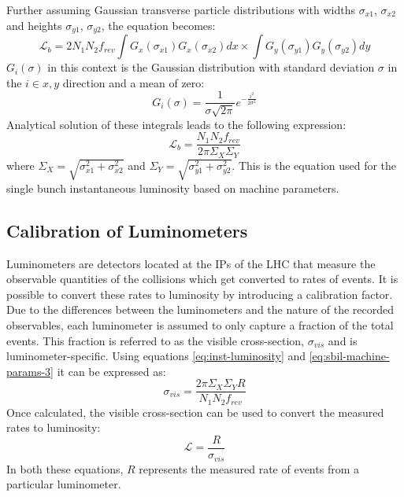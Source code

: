 Further assuming Gaussian transverse particle distributions with widths $\sigma_{x1}$, $\sigma_{x2}$ and heights $\sigma_{y1}$, $\sigma_{y2}$, the equation becomes:
\begin{equation}
    \label{eq:sbil-machine-params-3}
    \mathcal{L}_b = 2 N_1 N_2 f_{rev} \int G_x (\sigma_{x1}) G_x (\sigma_{x2}) dx \times \int G_y (\sigma_{y1}) G_y (\sigma_{y2}) dy
\end{equation}
$G_i (\sigma)$ in this context is the Gaussian distribution with standard deviation $\sigma$ in the $i \in {x,y}$ direction and a mean of zero:
\begin{equation}
    \label{eq:gaussian-distribution}
    G_i (\sigma) = \frac{1}{\sigma \sqrt{2 \pi}} e^{-\frac{i^2}{2 \sigma^2}}
\end{equation}
Analytical solution of these integrals leads to the following expression:
\begin{equation}
\label{eq:sbil-machine-params-4}
\mathcal{L}_b = \frac{N_1 N_2 f_{rev}}{2 \pi \Sigma_X \Sigma_Y}
\end{equation}
where $\Sigma_X = \sqrt{\sigma_{x1}^2 + \sigma_{x2}^2}$ and $\Sigma_Y = \sqrt{\sigma_{y1}^2 + \sigma_{y2}^2}$. This is the equation used for the single bunch instantaneous luminosity based on machine parameters.

\subsection{Calibration of Luminometers}
\label{subsec:calibration}

Luminometers are detectors located at the IPs of the LHC that measure the observable quantities of the collisions which get converted to rates of events. It is possible to convert these rates to luminosity by introducing a calibration factor. Due to the differences between the luminometers and the nature of the recorded observables, each luminometer is assumed to only capture a fraction of the total events. This fraction is referred to as the visible cross-section, $\sigma_{vis}$ and is luminometer-specific. Using equations \ref{eq:inst-luminosity} and \ref{eq:sbil-machine-params-3} it can be expressed as:
\begin{equation}
    \label{eq:vis-cross-section}
    \sigma_{vis} = \frac{2 \pi \Sigma_X \Sigma_Y R}{N_1 N_2 f_{rev}}
\end{equation}
Once calculated, the visible cross-section can be used to convert the measured rates to luminosity:
\begin{equation}
    \label{eq:luminosity-from-rates}
    \mathcal{L} = \frac{R}{\sigma_{vis}}
\end{equation}
In both these equations, $R$ represents the measured rate of events from a particular luminometer.

